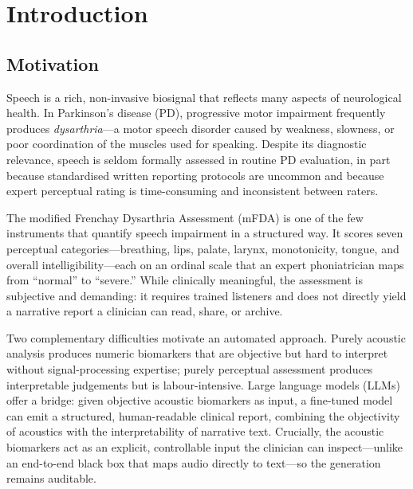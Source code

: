 \documentclass[11pt,twocolumn]{article}
\begin{document}
\section{Introduction}

\subsection{Motivation}
Speech is a rich, non-invasive biosignal that reflects many aspects of neurological health.
In Parkinson's disease (PD), progressive motor impairment frequently produces
\emph{dysarthria}---a motor speech disorder caused by weakness, slowness, or poor coordination
of the muscles used for speaking. Despite its diagnostic relevance, speech is seldom formally
assessed in routine PD evaluation, in part because standardised written reporting protocols are
uncommon and because expert perceptual rating is time-consuming and inconsistent between raters.

The modified Frenchay Dysarthria Assessment (mFDA) is one of the few instruments that quantify
speech impairment in a structured way. It scores seven perceptual categories---breathing, lips,
palate, larynx, monotonicity, tongue, and overall intelligibility---each on an ordinal scale
that an expert phoniatrician maps from ``normal'' to ``severe.'' While clinically meaningful,
the assessment is subjective and demanding: it requires trained listeners and does not directly
yield a narrative report a clinician can read, share, or archive.

Two complementary difficulties motivate an automated approach. Purely acoustic analysis produces
numeric biomarkers that are objective but hard to interpret without signal-processing expertise;
purely perceptual assessment produces interpretable judgements but is labour-intensive. Large
language models (LLMs) offer a bridge: given objective acoustic biomarkers as input, a fine-tuned
model can emit a structured, human-readable clinical report, combining the objectivity of
acoustics with the interpretability of narrative text. Crucially, the acoustic biomarkers act as
an explicit, controllable input the clinician can inspect---unlike an end-to-end black box that
maps audio directly to text---so the generation remains auditable.
\end{document}
